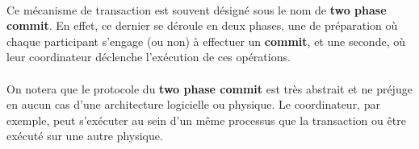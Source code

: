 {  \paragraph{} Ce mécanisme de transaction est souvent désigné sous le nom de \textbf{two phase
  commit}. En effet, ce dernier se déroule en deux phases, une de préparation où chaque participant
  s'engage (ou non) à effectuer un \textbf{commit}, et une seconde, où leur coordinateur déclenche
  l'exécution de ces opérations.

  \paragraph{} On notera que le protocole du \textbf{two phase commit} est très abstrait et ne
  préjuge en aucun cas d'une architecture logicielle ou physique. Le coordinateur, par exemple, peut
  s'exécuter au sein d'un même processus que la transaction ou être exécuté sur une autre physique.
}



